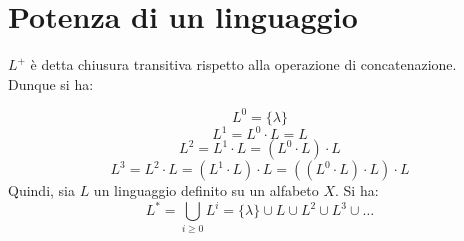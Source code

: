 \documentclass[12pt]{report}
\begin{document}
	\section{Potenza di un linguaggio}
	{
	}
	$L^+$ è detta chiusura transitiva rispetto alla operazione di concatenazione. \\
	Dunque si ha:

	\[	L^0 = \{\lambda\} \]
	\[	L^1 = L^0 \cdot L = L \]
	\[	L^2 = L^1 \cdot L = (L^0 \cdot L)\cdot L \]
	\[	L^3 = L^2 \cdot L = (L^1 \cdot L) \cdot L = ((L^0 \cdot L) \cdot L) \cdot L \]
	Quindi, sia $L$ un linguaggio definito su un alfabeto $X$. Si ha:
	\[
	L^* = \bigcup_{i \geq 0}L^i = \{\lambda\} \cup L \cup L^2 \cup L^3 \cup \dots
	\]
\end{document}

